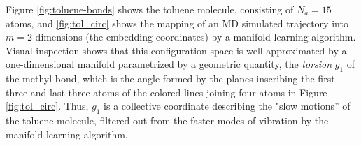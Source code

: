 Figure \ref{fig:toluene-bonds} shows the toluene molecule, consisting of $N_a=15$ atoms, and \ref{fig:tol_circ} shows the mapping of an MD simulated trajectory into $m=2$ dimensions (the embedding coordinates) by a manifold learning algorithm. Visual inspection shows that this configuration space is well-approximated by a one-dimensional manifold parametrized by a geometric quantity, the {\em torsion} $g_1$ of the methyl bond, which is the angle formed by the planes inscribing the first three and last three atoms of the colored lines joining four atoms in Figure \ref{fig:tol_circ}. Thus, $g_1$ is a collective coordinate describing the "slow motions'' of the toluene molecule, filtered out from the faster modes of vibration by the manifold learning algorithm. 
%
\begin{figure}[htb]
\hfill
{}\hfill
{}\hfill \newline
\subfloat[][$g_1$]{\includegraphics[width=3cm, height=3cm, trim={-1cm, -1cm,
}}
\end{figure}
